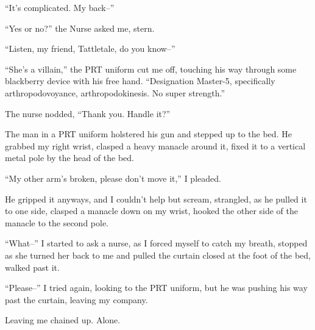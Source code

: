 ``It's complicated. My back--''



``Yes or no?'' the Nurse asked me, stern.



``Listen, my friend, Tattletale, do you know--''



``She's a villain,'' the PRT uniform cut me off, touching his way through some blackberry device with his free hand.  ``Designation Master-5, specifically arthropodovoyance, arthropodokinesis.  No super strength.''



The nurse nodded, ``Thank you.  Handle it?''



The man in a PRT uniform holstered his gun and stepped up to the bed.  He grabbed my right wrist, clasped a heavy manacle around it, fixed it to a vertical metal pole by the head of the bed.



``My other arm's broken, please don't move it,'' I pleaded.



He gripped it anyways, and I couldn't help but scream, strangled, as he pulled it to one side, clasped a manacle down on my wrist, hooked the other side of the manacle to the second pole.



``What--'' I started to ask a nurse, as I forced myself to catch my breath, stopped as she turned her back to me and pulled the curtain closed at the foot of the bed, walked past it.



``Please--'' I tried again, looking to the PRT uniform, but he was pushing his way past the curtain, leaving my company.



Leaving me chained up.  Alone.





